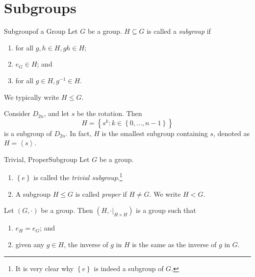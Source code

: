 \documentclass[pmath347]{subfiles}
\begin{document}

    \section{Subgroups}
    
    \begin{definition}{Subgroup}{of a Group}
        Let $G$ be a group. $H\subseteq G$ is called a \emph{subgroup} if
        \begin{enumerate}
            \item for all $g,h\in H, gh\in H$;
            \item $e_G\in H$; and
            \item for all $g\in H, g^{-1} \in H$.
        \end{enumerate}
        We typically write $H\leq G$.
    \end{definition}

    \ex Consider $D_{2n}$, and let $s$ be the rotation. Then
    \begin{equation*}
        H = \left\lbrace s^k: k\in\left\lbrace 0,\ldots,n-1 \right\rbrace  \right\rbrace 
    \end{equation*}
    is a subgroup of $D_{2n}$. In fact, $H$ is the smallest subgroup containing $s$, denoted as $H=\left< s \right>$. 

    \begin{definition}{Trivial, Proper}{Subgroup}
        Let $G$ be a group.
        \begin{enumerate}
            \item $\left\lbrace e \right\rbrace$ is called the \emph{trivial subgroup}.\footnote{It is very clear why $\left\lbrace e \right\rbrace$ is indeed a subgroup of $G$.}
            \item A subgroup $H\leq G$ is called \emph{proper} if $H\neq G$. We write $H<G$.
        \end{enumerate}
    \end{definition}

    \begin{prop}{}
        Let $\left( G,\cdot \right)$ be a group. Then $\left( H,\cdot|_{H\times H} \right)$ is a group such that
        \begin{enumerate}
            \item $e_H=e_G$; and
            \item given any $g\in H$, the inverse of $g$ in $H$ is the same as the inverse of $g$ in $G$.
        \end{enumerate}
    \end{prop}
\end{document}
